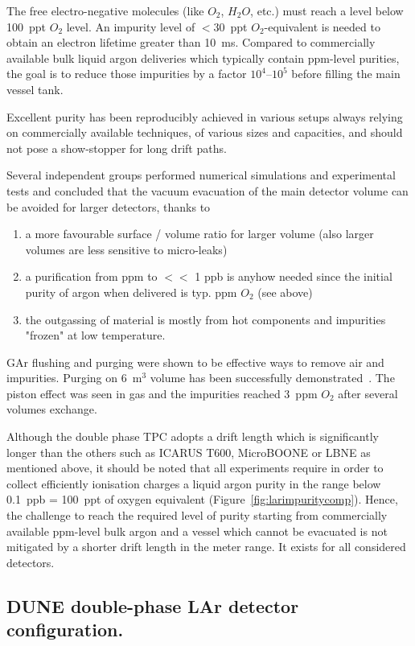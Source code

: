 The  free electro-negative molecules (like $O_2$, $H_2O$, etc.) must reach a level below 100~ppt $O_2$ level. An impurity level 
of $<30$~ppt $O_2$-equivalent is needed to obtain an electron lifetime greater than 10~ms. Compared to commercially available bulk liquid argon deliveries which typically contain ppm-level purities, the goal is to reduce those impurities by a factor $10^4$--$10^5$ before filling the main vessel tank. 

Excellent purity has been reproducibly achieved in various setups always relying on commercially available techniques, of various sizes and capacities, and should not pose a  show-stopper for long drift paths.

Several independent groups performed numerical simulations and experimental tests and  concluded that the vacuum evacuation of the main detector volume can be avoided for larger detectors, thanks to 
\begin{enumerate}
\item{ a more favourable surface / volume ratio for larger volume 
(also larger volumes are less sensitive to micro-leaks)}
\item{ a purification from ppm to $<<$ 1 ppb is anyhow needed
since the initial purity of argon when delivered is typ. ppm $O_2$ (see above)}
\item{  the outgassing of material is mostly from hot components
and impurities "frozen" at low temperature.}
\end{enumerate}

GAr flushing and purging were shown to be effective ways to remove air and impurities. Purging on 6~m$^3$ volume has been successfully demonstrated~\cite{Curioni:2010gd}. The piston effect was seen in gas and the impurities reached 3~ppm $O_2$ after several volumes exchange.

Although the double phase TPC adopts a drift length which is significantly longer than the others such as ICARUS T600, MicroBOONE or LBNE as mentioned above, it should be noted that all experiments require in order to collect efficiently ionisation charges a liquid argon purity
in the range below 0.1~ppb = 100~ppt of oxygen equivalent (Figure~\ref{fig:larimpuritycomp}).  Hence, the challenge to reach the required level of purity starting from commercially available ppm-level bulk argon and a vessel which cannot be evacuated  is not mitigated by a shorter drift length in the meter range. It exists for all considered detectors.

\subsection{ DUNE double-phase LAr detector configuration.}

